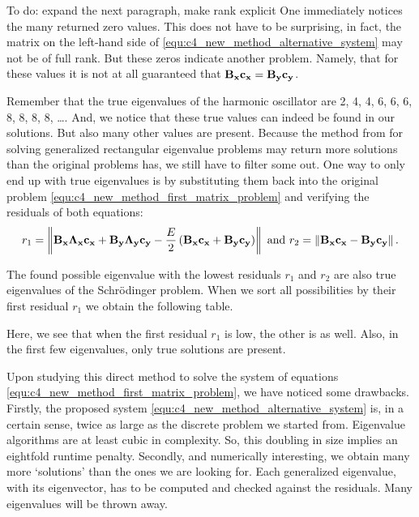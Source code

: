 {\color{red} To do: expand the next paragraph, make rank explicit}
One immediately notices the many returned zero values. This does not have to be surprising, in fact, the matrix on the left-hand side of \eqref{equ:c4_new_method_alternative_system} may not be of full rank. But these zeros indicate another problem. Namely, that for these values it is not at all guaranteed that $\vb{B_x} \vb{c_x} = \vb{B_y} \vb{c_y}$.

Remember that the true eigenvalues of the harmonic oscillator are 2, 4, 4, 6, 6, 6, 8, 8, 8, 8, \dots. And, we notice that these true values can indeed be found in our solutions. But also many other values are present. Because the method from \cite{hua_svd_1991} for solving generalized rectangular eigenvalue problems may return more solutions than the original problems has, we still have to filter some out. One way to only end up with true eigenvalues is by substituting them back into the original problem \eqref{equ:c4_new_method_first_matrix_problem} and verifying the residuals of both equations:
$$
    r_1 = \left\| \vb{B_x} \vb{\Lambda_x} \vb{c_x} + \vb{B_y} \vb{\Lambda_y} \vb{c_y} - \frac{E}{2}\left(\vb{B_x}\vb{c_x} + \vb{B_y}\vb{c_y}\right) \right\| \text{ and } r_2=\left\| \vb{B_x} \vb{c_x} - \vb{B_y} \vb{c_y} \right\|\text{.}
$$

The found possible eigenvalue with the lowest residuals $r_1$ and $r_2$ are also true eigenvalues of the Schrödinger problem. When we sort all possibilities by their first residual $r_1$ we obtain the following table.

\begin{center}
    
\end{center}

Here, we see that when the first residual $r_1$ is low, the other is as well. Also, in the first few eigenvalues, only true solutions are present.

Upon studying this direct method to solve the system of equations \eqref{equ:c4_new_method_first_matrix_problem}, we have noticed some drawbacks. Firstly, the proposed system \eqref{equ:c4_new_method_alternative_system} is, in a certain sense, twice as large as the discrete problem we started from. Eigenvalue algorithms are at least cubic in complexity. So, this doubling in size implies an eightfold runtime penalty. Secondly, and numerically interesting, we obtain many more `solutions' than the ones we are looking for. Each generalized eigenvalue, with its eigenvector, has to be computed and checked against the residuals. Many eigenvalues will be thrown away.


